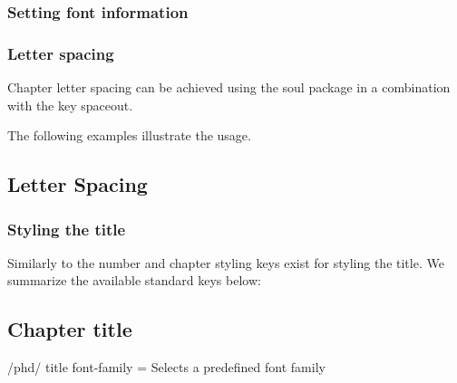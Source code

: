 \subsection{Setting font information}
\subsection{Letter spacing}

Chapter letter spacing can be achieved using the soul package in a combination with the key spaceout.
\medskip



\par\medskip



The following examples illustrate the usage.

\begin{texexample}{}{}
\chapter{Letter Spacing}
\end{texexample}





\subsection{Styling the title}

Similarly to the number and chapter styling keys exist for styling the title. We summarize the available standard keys below:
\medskip

\begin{texexample}{}{} 
\chapter{Chapter title}
\end{texexample}


\begin{key}{/phd/  title font-family = }Selects a predefined font family
\end{key}


